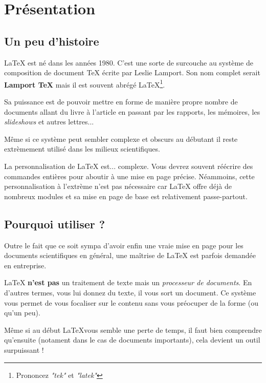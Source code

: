 \section{Présentation}

\subsection{Un peu d'histoire} %
    
    \LaTeX{} est né dans les années 1980.
    C'est une sorte de surcouche au système de composition de document \TeX{} écrite par Leslie Lamport.
    Son nom complet serait {\bfseries Lamport \TeX{}} mais il est souvent abrégé \LaTeX{}\footnote{Prononcez {\itshape "tek"} et {\itshape "latek"}}.
    
    Sa puissance est de pouvoir mettre en forme de manière propre nombre de documents allant du livre à l'article en passant par les rapports, les mémoires, les {\itshape slideshows} et autres lettres...

    Même si ce système peut sembler complexe et obscurs au débutant il reste extrèmement utilisé dans les milieux scientifiques.

    La personnalisation de \LaTeX{} est... complexe. Vous devrez souvent réécrire des commandes entières pour aboutir à une mise en page précise.
    Néammoins, cette personnalisation à l'extrème n'est pas nécessaire car \LaTeX{} offre déjà de nombreux modules et sa mise en page de base est relativement passe-partout.


\subsection{Pourquoi utiliser \protect{\LaTeX{}} ?} %

    Outre le fait que ce soit sympa d'avoir enfin une vraie mise en page pour les documents scientifiques en général, une maîtrise de \LaTeX{} est parfois demandée en entreprise.

    \LaTeX{} {\bfseries n'est pas} un traitement de texte mais un {\itshape processeur de documents}.
    En d'autres termes, vous lui donnez du texte, il vous sort un document.
    Ce système vous permet de vous focaliser sur le contenu sans vous préocuper de la forme (ou qu'un peu).

    Même si au début \LaTeX vous semble une perte de temps, il faut bien comprendre qu'ensuite (notament dans le cas de documents importants), cela devient un outil surpuissant !

